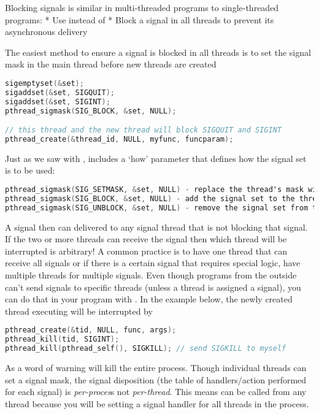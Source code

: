 Blocking signals is similar in multi-threaded programs to single-threaded programs:
* Use  instead of 
* Block a signal in all threads to prevent its asynchronous delivery

The easiest method to ensure a signal is blocked in all threads is to set the signal mask in the main thread before new threads are created

\begin{lstlisting}[language=C]
sigemptyset(&set);
sigaddset(&set, SIGQUIT);
sigaddset(&set, SIGINT);
pthread_sigmask(SIG_BLOCK, &set, NULL);

// this thread and the new thread will block SIGQUIT and SIGINT
pthread_create(&thread_id, NULL, myfunc, funcparam);
\end{lstlisting}

Just as we saw with ,  includes a `how' parameter that defines how the signal set is to be used:

\begin{lstlisting}[language=C]
pthread_sigmask(SIG_SETMASK, &set, NULL) - replace the thread's mask with given signal set
pthread_sigmask(SIG_BLOCK, &set, NULL) - add the signal set to the thread's mask
pthread_sigmask(SIG_UNBLOCK, &set, NULL) - remove the signal set from the thread's mask
\end{lstlisting}

A signal then can delivered to any signal thread that is not blocking that signal. If the two or more threads can receive the signal then which thread will be interrupted is arbitrary! A common practice is to have one thread that can receive all signals or if there is a certain signal that requires special logic, have multiple threads for multiple signals. Even though programs from the outside can't send signals to specific threads (unless a thread is assigned a signal), you can do that in your program with . In the example below, the newly created thread executing  will be interrupted by 

\begin{lstlisting}[language=C]
pthread_create(&tid, NULL, func, args);
pthread_kill(tid, SIGINT);
pthread_kill(pthread_self(), SIGKILL); // send SIGKILL to myself
\end{lstlisting}

As a word of warning  will kill the entire process. Though individual threads can set a signal mask, the signal disposition (the table of handlers/action performed for each signal) is \emph{per-proces}s not \emph{per-thread}. This means  can be called from any thread because you will be setting a signal handler for all threads in the process.

